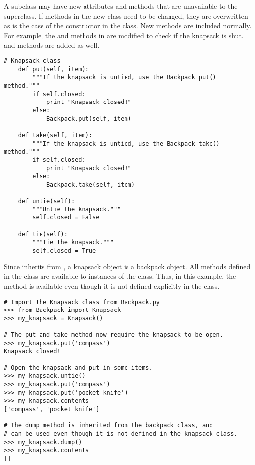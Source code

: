 A subclass may have new attributes and methods that are unavailable to the superclass.
If methods in the new class need to be changed, they are overwritten as is the case of the constructor in the  class.
New methods are included normally.
For example, the  and  methods in  are modified to check if the knapsack is shut. 
 and  methods are added as well.

\begin{lstlisting}
# Knapsack class
    def put(self, item):
        """If the knapsack is untied, use the Backpack put() method."""
        if self.closed:
            print "Knapsack closed!"
        else:
            Backpack.put(self, item)
    
    def take(self, item):
        """If the knapsack is untied, use the Backpack take() method."""
        if self.closed:
            print "Knapsack closed!"
        else:
            Backpack.take(self, item)
    
    def untie(self):
        """Untie the knapsack."""
        self.closed = False
    
    def tie(self):
        """Tie the knapsack."""
        self.closed = True
\end{lstlisting}

Since  inherits from , a knapsack object is a backpack object.
All methods defined in the  class are available to instances of the  class.
Thus, in this example, the  method is available even though it is not defined explicitly in the  class.

\begin{lstlisting}
# Import the Knapsack class from Backpack.py
>>> from Backpack import Knapsack
>>> my_knapsack = Knapsack()

# The put and take method now require the knapsack to be open.
>>> my_knapsack.put('compass')
Knapsack closed!

# Open the knapsack and put in some items.
>>> my_knapsack.untie()
>>> my_knapsack.put('compass')
>>> my_knapsack.put('pocket knife')
>>> my_knapsack.contents
['compass', 'pocket knife']

# The dump method is inherited from the backpack class, and
# can be used even though it is not defined in the knapsack class.
>>> my_knapsack.dump()
>>> my_knapsack.contents
[]
\end{lstlisting}

